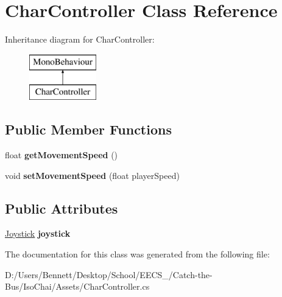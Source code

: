 \hypertarget{class_char_controller}{}\section{Char\+Controller Class Reference}
\label{class_char_controller}
Inheritance diagram for Char\+Controller\+:\begin{figure}[H]
\begin{center}
\leavevmode
\includegraphics[height=2.000000cm]{class_char_controller}
\end{center}
\end{figure}
\subsection*{Public Member Functions}
\begin{DoxyCompactItemize}
\item 
\mbox{\label{class_char_controller_ae0051c448de79b948f7b461667cc0d8f}} 
float {\bfseries get\+Movement\+Speed} ()
\item 
\mbox{\label{class_char_controller_a1cbf7adaa2319c6411a8745a0b704835}} 
void {\bfseries set\+Movement\+Speed} (float player\+Speed)
\end{DoxyCompactItemize}
\subsection*{Public Attributes}
\begin{DoxyCompactItemize}
\item 
\mbox{\label{class_char_controller_a61830f88f881dd25a5d4e399c08b3207}} 
\mbox{\hyperlink{class_joystick}{Joystick}} {\bfseries joystick}
\end{DoxyCompactItemize}


The documentation for this class was generated from the following file\+:\begin{DoxyCompactItemize}
\item 
D\+:/\+Users/\+Bennett/\+Desktop/\+School/\+E\+E\+C\+S\+\_/\+Catch-\/the-\/\+Bus/\+Iso\+Chai/\+Assets/Char\+Controller.\+cs\end{DoxyCompactItemize}
